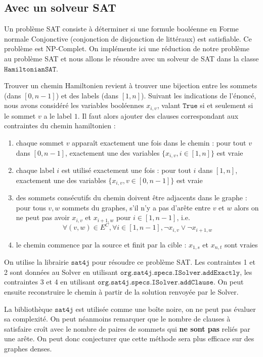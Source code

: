 \documentclass[11pt, a4paper]{article}
\begin{document}
\subsection{Avec un solveur SAT}

\label{hamSAT}

Un problème SAT consiste à déterminer si une formule booléenne en Forme normale Conjonctive (conjonction de disjonction de littéraux) est satisfiable. Ce problème est NP-Complet. On implémente ici une réduction de notre problème au problème SAT et nous allons le résoudre avec un solveur de SAT dans la classe $\mathtt{HamiltonianSAT}$.

Trouver un chemin Hamiltonien revient à trouver une bijection entre les sommets (dans $[0, n- 1]$) et des labels (dans $[1, n]$). Suivant les indications de l'énoncé, nous avons considéré les variables booléennes $x_{i, v}$, valant $\mathtt{True}$ si et seulement si le sommet $v$ a le label $1$. Il faut alors ajouter des clauses correspondant aux contraintes du chemin hamiltonien :
\begin{enumerate}
	\item chaque sommet $v$ apparaît exactement une fois dans le chemin : pour tout $v$ dans $[0, n-1]$, exactement une des variables $\{x_{i, v}, i\in[1, n] \}$ est vraie
	\item chaque label $i$ est utilisé exactement une fois : pour tout $i$ dans $[1, n]$, exactement une des variables $\{x_{i, v}, v\in[0, n-1] \}$ est vraie
	\item des sommets consécutifs du chemin doivent être adjacents dans le graphe : pour tous $v, w$ sommets du graphes, s'il n'y a pas d'arête entre $v$ et $w$ alors on ne peut pas avoir $x_{i, v}$ et $x_{i+1, w}$ pour $i \in [1, n-1]$, i.e.
	\[\forall (v, w) \in E^C, \forall i \in [1, n- 1], \neg x_{i, v} \lor \neg x_{i+1, w}\]
	\item le chemin commence par la source et finit par la cible : $x_{1, s}$ et $x_{n, t}$ sont vraies
\end{enumerate}

On utilise la librairie $\mathtt{sat4j}$ pour résoudre ce problème SAT. Les contraintes 1 et 2 sont données au Solver en utilisant $\mathtt{org.sat4j.specs.ISolver.addExactly}$, les contraintes 3 et 4 en utilisant $\mathtt{org.sat4j.specs.ISolver.addClause}$. On peut ensuite reconstruire le chemin à partir de la solution renvoyée par le Solver.

La bibliothèque $\mathtt{sat4j}$ est utilisée comme une boîte noire, on ne peut pas évaluer sa complexité. On peut néanmoins remarquer que le nombre de clauses à satisfaire croît avec le nombre de paires de sommets qui \textbf{ne sont pas} reliés par une arête. On peut donc conjecturer que cette méthode sera plus efficace sur des graphes denses.
\end{document}
